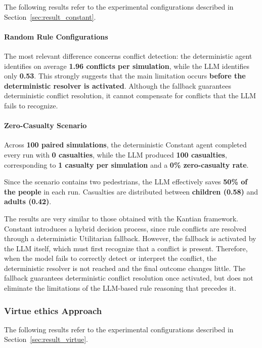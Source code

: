 \documentclass[10pt,a4paper]{article}
\begin{document}
The following results refer to the experimental configurations described in
Section~\ref{sec:result_constant}.

\paragraph{Random Rule Configurations}

The most relevant difference concerns conflict detection: the deterministic
agent identifies on average \textbf{1.96 conflicts per simulation}, while the
LLM identifies only \textbf{0.53}. This strongly suggests that the main
limitation occurs \textbf{before the deterministic resolver is activated}.
Although the fallback guarantees deterministic conflict resolution, it cannot
compensate for conflicts that the LLM fails to recognize.

\paragraph{Zero-Casualty Scenario}

Across \textbf{100 paired simulations}, the deterministic Constant agent
completed every run with \textbf{0 casualties}, while the LLM produced
\textbf{100 casualties}, corresponding to \textbf{1 casualty per simulation}
and a \textbf{0\% zero-casualty rate}.

Since the scenario contains two pedestrians, the LLM effectively saves
\textbf{50\% of the people} in each run. Casualties are distributed between
\textbf{children (0.58)} and \textbf{adults (0.42)}.

The results are very similar to those obtained with the Kantian framework.
Constant introduces a hybrid decision process, since rule conflicts are
resolved through a deterministic Utilitarian fallback. However, the fallback
is activated by the LLM itself, which must first recognize that a conflict is
present. Therefore, when the model fails to correctly detect or interpret the
conflict, the deterministic resolver is not reached and the final outcome
changes little. The fallback guarantees deterministic conflict resolution
once activated, but does not eliminate the limitations of the LLM-based rule
reasoning that precedes it.


\subsubsection{Virtue ethics Approach}

The following results refer to the experimental configurations described in
Section~\ref{sec:result_virtue}.
\end{document}
